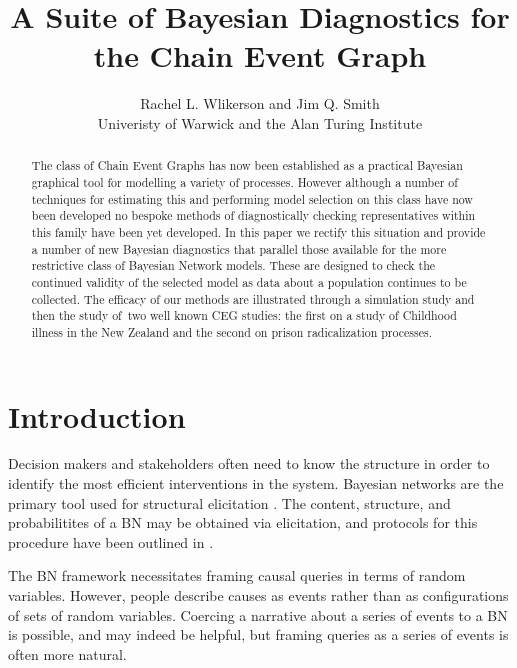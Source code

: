 \documentclass[12pt]{article}
\begin{document}
\title{A Suite of Bayesian Diagnostics for the Chain Event Graph}
\author{Rachel L. Wlikerson and Jim Q. Smith \\
Univeristy of Warwick and the Alan Turing Institute}
\maketitle

\begin{abstract}
The class of Chain Event Graphs has now been established as a practical
Bayesian graphical tool for modelling a variety of processes. However
although a number of techniques for estimating this and performing model
selection on this class have now been developed no bespoke methods of
diagnostically checking representatives within this family have been yet
developed. In this paper we rectify this situation and provide a number of
new Bayesian diagnostics that parallel those available for the more
restrictive class of Bayesian Network models. These are designed to check
the continued validity of the selected model as data about a population
continues to be collected. The efficacy of our methods are illustrated
through a simulation study and then the study of\ two well known CEG
studies: the first on a study of Childhood illness in the New Zealand and
the second on prison radicalization processes.    
\end{abstract}

\section{Introduction }

Decision makers and stakeholders often need to know the structure in order to identify the most efficient interventions in the system. Bayesian networks are the primary tool used for structural elicitation \cite{Lord2016,Pitchforth2013}. The content, structure, and probabilitites of a BN may be obtained via elicitation, and protocols for this procedure have been outlined in \cite{EFSA} \cite{Ohagan}. 

The BN framework necessitates framing causal queries in terms of random variables. However, people describe causes as events rather than as configurations of sets of random variables. Coercing a narrative about a series of events to a BN is possible, and may indeed be helpful, but framing queries as a series of events is often more natural. 

\end{document}
